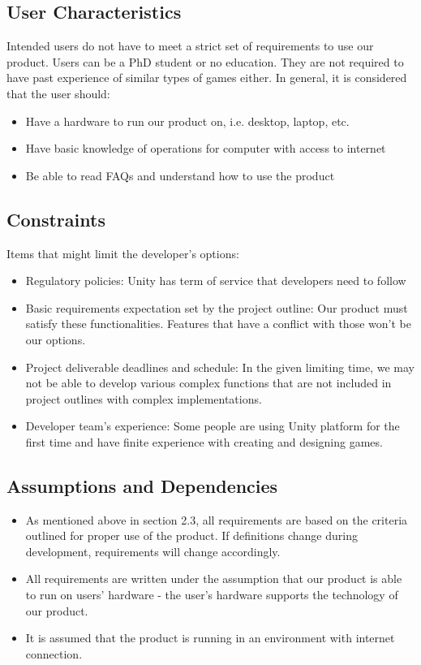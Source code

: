 \documentclass[]{article}
\begin{document}
\subsection{User Characteristics}
\label{sub:user_characteristics}
Intended users do not have to meet a strict set of requirements to use our 
product. Users can be a PhD student or no education. They are not required to 
have past experience of similar types of games either. In general, it is 
considered that the user should:

\begin{itemize}
    \item Have a hardware to run our product on, i.e. desktop, laptop, etc.
    \item Have basic knowledge of operations for computer with access to internet
    \item Be able to read FAQs and understand how to use the product
\end{itemize}

\subsection{Constraints}
\label{sub:constraints}
Items that might limit the developer's options:

\begin{itemize}
    \item Regulatory policies: Unity has term of service that developers need 
    to follow
    \item Basic requirements expectation set by the project outline: Our 
    product must satisfy these functionalities. Features that have a conflict 
    with those won’t be our options.
    \item Project deliverable deadlines and schedule: In the given limiting 
    time, we may not be able to develop various complex functions that are not 
    included in project outlines with complex implementations.
    \item Developer team’s experience: Some people are using Unity platform for 
    the first time and have finite experience with creating and designing games.
\end{itemize}

\subsection{Assumptions and Dependencies}
\label{sub:assumptions_and_dependencies}
\begin{itemize}
    \item As mentioned above in section 2.3, all requirements are based on the 
    criteria outlined for proper use of the product. If definitions change 
    during development, requirements will change accordingly.
    \item All requirements are written under the assumption that our product is 
    able to run on users’ hardware - the user’s hardware supports the technology 
    of our product.
    \item It is assumed that the product is running in an environment with 
    internet connection.
\end{itemize}
\end{document}
